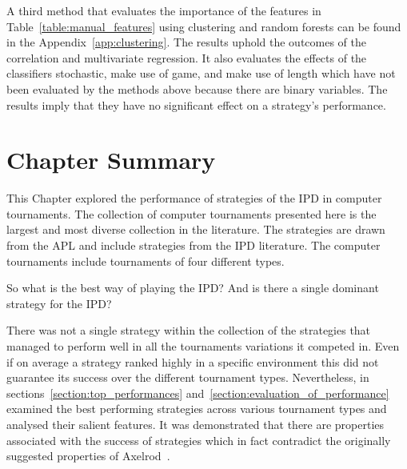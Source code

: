 A third method that evaluates the importance of the features in
Table~\ref{table:manual_features} using clustering and random forests can be found in
the Appendix~\ref{app:clustering}. The results uphold the outcomes of the
correlation and multivariate regression. It also evaluates the effects
of the classifiers stochastic, make use of game, and make use of length which
have not been evaluated by the methods above because there are binary variables.
The results imply that they have no significant effect on a strategy's
performance.

\section{Chapter Summary}

This Chapter explored the performance of \numberofstrategies strategies of the
IPD in \numberofalltournaments computer tournaments. The collection of computer
tournaments presented here is the largest and most diverse collection in the
literature. The \numberofstrategies strategies are drawn from the APL and
include strategies from the IPD literature. The computer tournaments include
tournaments of four different types.

So what is the best way of playing the IPD? And is there a single dominant
strategy for the IPD? 

There was not a single strategy within the collection of the \numberofstrategies
strategies that managed to perform well in all the tournaments variations it
competed in. Even if on average a strategy ranked highly in a specific
environment this did not guarantee its success over the different tournament
types. Nevertheless, in sections~\ref{section:top_performances}
and~\ref{section:evaluation_of_performance} examined the best performing
strategies across various tournament types and analysed their salient features.
It was demonstrated that there are properties associated with the success of
strategies which in fact contradict the originally suggested properties of
Axelrod~\cite{Axelrod1981}.

